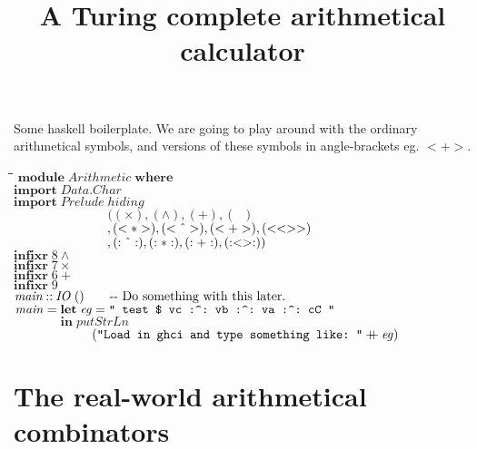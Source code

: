 \documentclass{article}
\title{A Turing complete arithmetical calculator}
\newlength{\lwidth}\setlength{\lwidth}{4.5cm}
\newlength{\cwidth}\setlength{\cwidth}{8mm} %
\newcommand{\Conid}[1]{\mathit{#1}}
\newcommand{\Varid}[1]{\mathit{#1}}
\newcommand{\plus}{\mathbin{+\!\!\!+}}
\begin{document}
\maketitle 
Some haskell boilerplate. We are going to play around with
the ordinary arithmetical symbols, and versions of these
symbols in angle-brackets eg. \ensuremath{\mathbin{<+>}}.

\begin{tabbing}
\qquad\=\hspace{\lwidth}\=\hspace{\cwidth}\=\+\kill
${\mathbf{module}\;\Conid{Arithmetic}\;\mathbf{where}}$\\
${\mathbf{import}\;\Conid{\Conid{Data}.Char}}$\\
${\mathbf{import}\;\Conid{Prelude}\;\Varid{hiding}\;}$\\
${\phantom{\mathbf{import}\;\Conid{Prelude}\;\mbox{}}((\times),(\wedge),(\mathbin{+}),(\!\mathop{{}^{{}^{\cdot}}}\!)}$\\
${\phantom{\mathbf{import}\;\Conid{Prelude}\;\mbox{}},(\mathbin{<*>}),(\mathbin{<\char94 >}),(\mathbin{<+>}),(\mathbin{<<>>})}$\\
${\phantom{\mathbf{import}\;\Conid{Prelude}\;\mbox{}},(\mathbin{:\char94 :}),(\mathbin{:*:}),(\mathbin{:+:}),(\mathbin{:<>:}))}$\\
${\mathbf{infixr}\;\mathrm{8}\wedge}$\\
${\mathbf{infixr}\;\mathrm{7}\times}$\\
${\mathbf{infixr}\;\mathrm{6}\mathbin{+}}$\\
${\mathbf{infixr}\;\mathrm{9}\!\mathop{{}^{{}^{\cdot}}}\!}$\\
${}$\\
${\Varid{main}\mathbin{::}\Conid{IO}\;()\mbox{\qquad-{}-  Do something with this later.}}$\\
${\Varid{main}\mathrel{=}\mathbf{let}\;\Varid{eg}\mathrel{=}\text{\ttfamily \char34 ~test~\$~vc~:\char94 :~vb~:\char94 :~va~:\char94 :~cC~\char34}}$\\
${\phantom{\Varid{main}\mathrel{=}\mbox{}}\mathbf{in}\;\Varid{putStrLn}\;}$\\
${\phantom{\Varid{main}\mathrel{=}\mbox{}}\hskip2.50em\relax(\text{\ttfamily \char34 Load~in~ghci~and~type~something~like:~\char34}\plus \Varid{eg})}$
\end{tabbing}
\section{The real-world arithmetical combinators}
\end{document}
